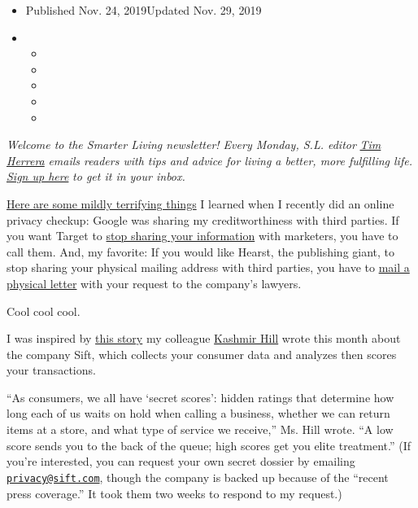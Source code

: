 \begin{itemize}
\item
  Published Nov. 24, 2019Updated Nov. 29, 2019
\item
  \begin{itemize}
  \item
  \item
  \item
  \item
  \item
  \end{itemize}
\end{itemize}

\emph{Welcome to the Smarter Living newsletter! Every Monday, S.L.
editor} \href{https://twitter.com/timherrera}{\emph{Tim Herrera}}
\emph{emails readers with tips and advice for living a better, more
fulfilling life.}
\href{https://www.nytimes3xbfgragh.onion/newsletters/smarter-living?module=inline}{\emph{Sign
up here}} \emph{to get it in your inbox.}

\href{https://twitter.com/TimHerrera/status/1195067771463360512}{Here
are some mildly terrifying things} I learned when I recently did an
online privacy checkup: Google was sharing my creditworthiness with
third parties. If you want Target to
\href{https://twitter.com/TimHerrera/status/1195075728859156481}{stop
sharing your information} with marketers, you have to call them. And, my
favorite: If you would like Hearst, the publishing giant, to stop
sharing your physical mailing address with third parties, you have to
\href{https://twitter.com/TimHerrera/status/1195070845967851521}{mail a
physical letter} with your request to the company's lawyers.

Cool cool cool.

I was inspired by
\href{https://www.nytimes3xbfgragh.onion/2019/11/04/business/secret-consumer-score-access.html}{this
story} my colleague
\href{https://www.nytimes3xbfgragh.onion/by/kashmir-hill}{Kashmir Hill}
wrote this month about the company Sift, which collects your consumer
data and analyzes then scores your transactions.

``As consumers, we all have `secret scores': hidden ratings that
determine how long each of us waits on hold when calling a business,
whether we can return items at a store, and what type of service we
receive,'' Ms. Hill wrote. ``A low score sends you to the back of the
queue; high scores get you elite treatment.'' (If you're interested, you
can request your own secret dossier by emailing
\href{mailto:privacy@sift.com}{\nolinkurl{privacy@sift.com}}, though the
company is backed up because of the ``recent press coverage.'' It took
them two weeks to respond to my request.)

